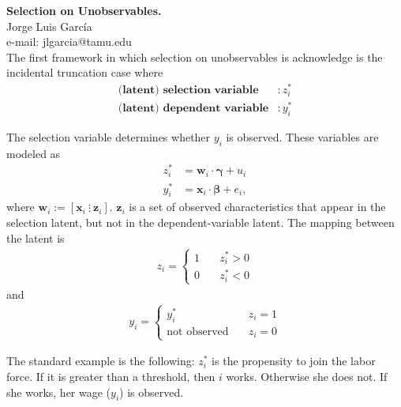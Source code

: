 
\let\counterwithout\relax
\let\counterwithin\relax
{}



\noindent \textbf{Selection on Unobservables.}\\
\noindent Jorge Luis García \\
\noindent e-mail: jlgarcia@tamu.edu\\

\noindent The first framework in which selection on unobservables is acknowledge is the incidental truncation case where 
\begin{align}
	\textbf{(latent) selection variable} &: z_{i}^* \nonumber \\ 
	\textbf{(latent) dependent variable} &: y_{i}^* \nonumber
\end{align}

\noindent The selection variable determines whether $y_i$ is observed. These variables are modeled as
\begin{align}
	z_i^* & = \bm{w}_i \cdot \bm{\gamma} + u_i \nonumber \\
	y_i^* & = \bm{x}_i \cdot \bm{\beta} + e_i, 
\end{align}
\noindent where $\bm{w}_i := \left[ \bm{x}_i \ \vdots \  \bm{z}_i \right]$. $\bm{z}_i$ is a set of observed characteristics that appear in the selection latent, but not in the dependent-variable latent. The mapping between the latent is 
\begin{align}
z_i = \left\{
        \begin{array}{ll}
            1 & \quad z_i^* > 0 \\
            0 & \quad z_i^* < 0
        \end{array}
    \right.
\end{align}
\noindent and 
\begin{align}
y_i = \left\{
        \begin{array}{ll}
            y_i^* & \quad z_i = 1 \\
            \text{not observed} & \quad z_i = 0
        \end{array}
    \right.
\end{align}

\noindent The standard example is the following: $z_i^*$ is the propensity to join the labor force. If it is greater than a threshold, then $i$ works. Otherwise she does not. If she works, her wage ($y_i$) is observed.\\

